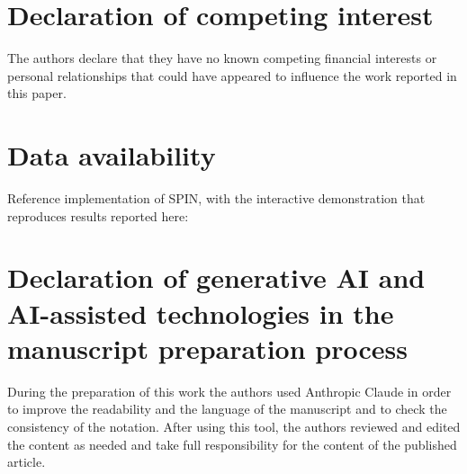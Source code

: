 \documentclass[final,3p,times,twocolumn]{elsarticle}
\newcommand{\spin}{SPIN\xspace}
\begin{document}
\section*{Declaration of competing interest}
The authors declare that they have no known competing financial
interests or personal relationships that could have appeared to
influence the work reported in this paper.


\section*{Data availability}
Reference implementation of \spin, with the interactive demonstration
that reproduces results reported here:


\section*{Declaration of generative AI and AI-assisted technologies in
the manuscript preparation process}
During the preparation of this work the authors used Anthropic Claude in
order to improve the readability and the language of the manuscript and
to check the consistency of the notation. After using this tool, the
authors reviewed and edited the content as needed and take full
responsibility for the content of the published article.
\end{document}
